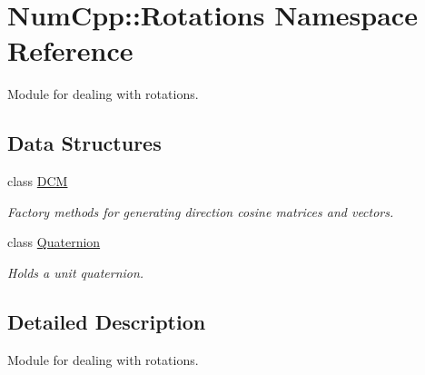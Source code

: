 \hypertarget{namespace_num_cpp_1_1_rotations}{}\section{Num\+Cpp\+:\+:Rotations Namespace Reference}
\label{namespace_num_cpp_1_1_rotations}


Module for dealing with rotations.  


\subsection*{Data Structures}
\begin{DoxyCompactItemize}
\item 
class \mbox{\hyperlink{class_num_cpp_1_1_rotations_1_1_d_c_m}{D\+CM}}
\begin{DoxyCompactList}\small\item\em Factory methods for generating direction cosine matrices and vectors. \end{DoxyCompactList}\item 
class \mbox{\hyperlink{class_num_cpp_1_1_rotations_1_1_quaternion}{Quaternion}}
\begin{DoxyCompactList}\small\item\em Holds a unit quaternion. \end{DoxyCompactList}\end{DoxyCompactItemize}


\subsection{Detailed Description}
Module for dealing with rotations. 